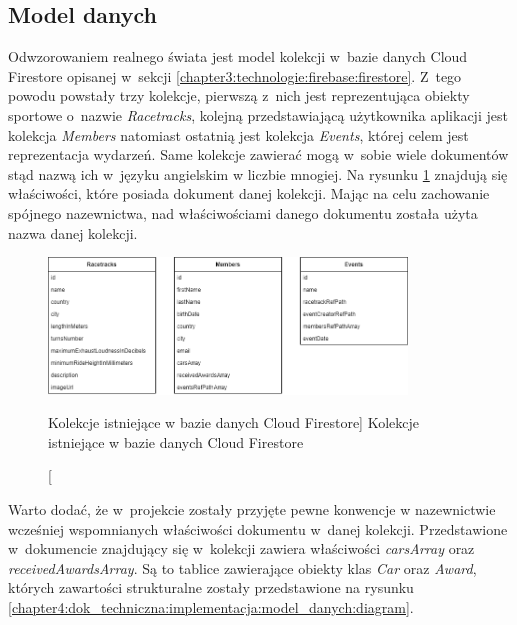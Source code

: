 \documentclass[../Kamil_Kowalewski_Main.tex]{subfiles}
\begin{document}
{{        \subsection{Model danych}
        \label{chapter4:dok_techniczna:implementacja:model_danych} {
            Odwzorowaniem realnego świata jest model kolekcji w~bazie danych Cloud
            Firestore opisanej w~sekcji \ref{chapter3:technologie:firebase:firestore}.
            Z~tego powodu powstały trzy kolekcje, pierwszą z~nich jest reprezentująca
            obiekty sportowe o~nazwie \textit{Racetracks}, kolejną przedstawiającą
            użytkownika aplikacji jest kolekcja \textit{Members} natomiast ostatnią
            jest kolekcja \textit{Events}, której celem jest reprezentacja wydarzeń.
            Same kolekcje zawierać mogą w~sobie wiele dokumentów stąd nazwą ich
            w~języku angielskim w liczbie mnogiej. Na rysunku
            \ref{chapter4:dok_techniczna:implementacja:model_danych:diagram_kolekcji}
            znajdują się właściwości, które posiada dokument danej kolekcji. Mając na
            celu zachowanie spójnego nazewnictwa, nad właściwościami danego dokumentu
            została użyta nazwa danej kolekcji.

            \begin{figure}[H]
                \centering
                \includegraphics[width=0.85\textwidth, keepaspectratio]
                {img/chapter4/firestore_collection_diagram.png}
                \caption
                [Kolekcje istniejące w bazie danych Cloud Firestore]
                {Kolekcje istniejące w bazie danych Cloud Firestore}
                \label{chapter4:dok_techniczna:implementacja:model_danych:diagram_kolekcji}
            \end{figure}

            Warto dodać, że w~projekcie zostały przyjęte pewne konwencje w nazewnictwie
            wcześniej wspomnianych właściwości dokumentu w~danej kolekcji.
            Przedstawione w~dokumencie znajdujący się w~kolekcji zawiera właściwości
            \textit{carsArray} oraz \textit{receivedAwardsArray}. Są to tablice
            zawierające obiekty klas \textit{Car} oraz \textit{Award}, których
            zawartości strukturalne zostały przedstawione na rysunku
            \ref{chapter4:dok_techniczna:implementacja:model_danych:diagram}.

}}}
\end{document}
